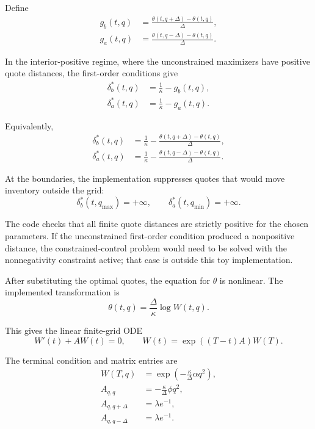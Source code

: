 \documentclass[11pt]{article}
\begin{document}
Define
\begin{align}
g_b(t,q)
&= \frac{\theta(t,q+\Delta)-\theta(t,q)}{\Delta}, \\
g_a(t,q)
&= \frac{\theta(t,q-\Delta)-\theta(t,q)}{\Delta}.
\end{align}

In the interior-positive regime, where the unconstrained maximizers have positive quote distances, the first-order conditions give
\begin{align}
\delta_{b}^{*}(t,q) &= \frac{1}{\kappa}-g_b(t,q), \\
\delta_{a}^{*}(t,q) &= \frac{1}{\kappa}-g_a(t,q).
\end{align}

Equivalently,
\begin{align}
\delta_{b}^{*}(t,q)
&= \frac{1}{\kappa}
   - \frac{\theta(t,q+\Delta)-\theta(t,q)}{\Delta}, \\
\delta_{a}^{*}(t,q)
&= \frac{1}{\kappa}
   - \frac{\theta(t,q-\Delta)-\theta(t,q)}{\Delta}.
\end{align}

At the boundaries, the implementation suppresses quotes that would move inventory outside the grid:
\begin{equation}
\delta_{b}^{*}(t,q_{\max})=+\infty,
\qquad
\delta_{a}^{*}(t,q_{\min})=+\infty.
\end{equation}

The code checks that all finite quote distances are strictly positive for the chosen parameters. If the unconstrained first-order condition produced a nonpositive distance, the constrained-control problem would need to be solved with the nonnegativity constraint active; that case is outside this toy implementation.

After substituting the optimal quotes, the equation for $\theta$ is nonlinear. The implemented transformation is
\begin{equation}
\theta(t,q)=\frac{\Delta}{\kappa}\log W(t,q).
\end{equation}

This gives the linear finite-grid ODE
\begin{equation}
W'(t)+AW(t)=0,
\qquad
W(t)=\exp((T-t)A)W(T).
\end{equation}

The terminal condition and matrix entries are
\begin{align}
W(T,q) &= \exp\left(-\frac{\kappa}{\Delta}\alpha q^2\right), \\
A_{q,q} &= -\frac{\kappa}{\Delta}\phi q^2, \\
A_{q,q+\Delta} &= \lambda e^{-1}, \\
A_{q,q-\Delta} &= \lambda e^{-1}.
\end{align}
\end{document}
